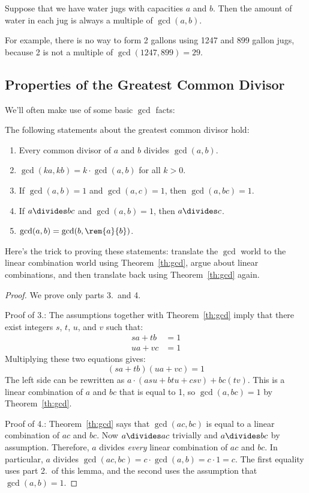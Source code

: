 \begin{corollary}
\label{cor:waterjugs}
Suppose that we have water jugs with capacities $a$ and $b$.  Then the
amount of water in each jug is always a multiple of $\gcd(a, b)$.
\end{corollary}

For example, there is no way to form 2 gallons using 1247 and 899 gallon
jugs, because 2 is not a multiple of $\gcd(1247, 899) = 29$.


\subsection{Properties of the Greatest Common Divisor}

We'll often make use of some basic $\gcd$ facts:

\begin{lemma} The following statements about the greatest common divisor hold:
\label{lem:gcd}
%
\begin{enumerate}
\item Every common divisor of $a$ and $b$ divides $\gcd(a, b)$.
\item $\gcd(k a, k b) = k \cdot \gcd(a, b)$ for all $k > 0$.
\item\label{gcd3} If $\gcd(a, b) = 1$ and $\gcd(a, c) = 1$, then $\gcd(a, bc) =
1$.
\item If $a \divides b c$ and $\gcd(a, b) = 1$, then $a \divides c$.
\item\label{gcd5} $\gcd(a, b) = \gcd(b, \rem{a}{b})$.
\end{enumerate}
\end{lemma}

Here's the trick to proving these statements: translate the $\gcd$
world to the linear combination world using Theorem~\ref{th:gcd},
argue about linear combinations, and then translate back using
Theorem~\ref{th:gcd} again.

\begin{proof}
We prove only parts 3.\ and 4.

Proof of 3.: The assumptions together with Theorem~\ref{th:gcd} imply
that there exist integers $s$, $t$, $u$, and $v$ such that:
%
\begin{align*}
s a + t b & = 1 \\
u a + v c & = 1
\end{align*}
%
Multiplying these two equations gives:
\[
(s a + t b)(u a + v c) = 1
\]
%
The left side can be rewritten as $a \cdot (a s u + b t u + c s v) + b c
(t v)$.  This is a linear combination of $a$ and $b c$ that is equal to 1,
so $\gcd(a, bc) = 1$ by Theorem~\ref{th:gcd}.

Proof of 4.: Theorem~\ref{th:gcd} says that $\gcd(ac, bc)$ is equal to a
linear combination of $ac$ and $bc$.  Now $a \divides ac$ trivially and $a
\divides bc$ by assumption.  Therefore, $a$ divides \textit{every} linear
combination of $ac$ and $bc$.  In particular, $a$ divides $\gcd(ac, bc) =
c \cdot \gcd(a, b) = c\cdot 1 = c$.  The first equality uses part 2.\ of
this lemma, and the second uses the assumption that $\gcd(a, b) = 1$.
\end{proof}

